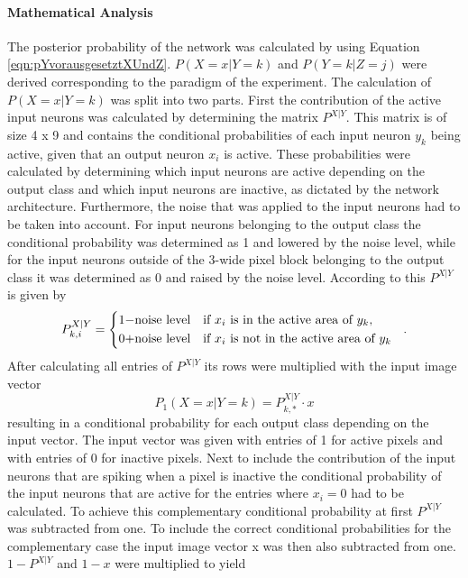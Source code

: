 \paragraph{Mathematical Analysis}
The posterior probability of the network was calculated by using Equation \ref{eqn:pYvorausgesetztXUndZ}.
$P(X=x|Y=k)$ and $P(Y=k|Z=j)$ were derived corresponding to the paradigm of the experiment.
 The calculation of $P(X=x|Y=k)$ was split into two parts. First the contribution of the active input neurons was calculated by determining the matrix $P^{X|Y}$. This matrix is of size 4 x 9 and contains the conditional probabilities of each input neuron $y_k$ being active, given that an output neuron $x_i$ is active. These probabilities were calculated by determining which input neurons are active depending on the output class and which input neurons are inactive, as dictated by the network architecture. Furthermore, the noise that was applied to the input neurons had to be taken into account. For input neurons belonging to the output class the conditional probability was determined as 1 and lowered by the noise level, while for the input neurons outside of the 3-wide pixel block belonging to the output class it was determined as 0 and raised by the noise level. According to this $P^{X|Y}$ is given by
\begin{equation}
\label{eqn:PXvorausgesetztYIf}
P_{k,i}^{X|Y} = \begin{dcases*} 1 - $noise level$ & if $x_i$ is in the active area of $y_k$, \\
0 + $noise level$ & \text{if $x_i$ is not in the active area of $ y_k $ } \end{dcases*}.\end{equation}
  After calculating all entries of $P^{X|Y}$ its rows were multiplied with the input image vector
\begin{equation}
\label{eqn:p1XvorausgesetztYMalX}
P_1(X = x|Y = k) = P^{X|Y}_{k,*} \cdot x
\end{equation}
resulting in a conditional probability for each output class depending on the input vector. The input vector was given with entries of 1 for active pixels and with entries of 0 for inactive pixels.
Next to include the contribution of the input neurons that are spiking when a pixel is inactive the conditional probability of the input neurons that are active for the entries where $x_i = 0$ had to be calculated. To achieve this complementary conditional probability at first $P^{X|Y}$ was subtracted from one. To include the correct conditional probabilities for the complementary case the input image vector x was then also subtracted from one. $1 - P^{X|Y}$ and $1 - x$ were multiplied to yield
